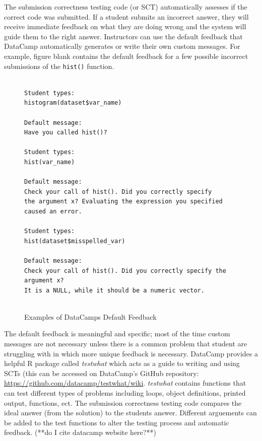 \documentclass[12pt]{article}
\begin{document}
The submission correctness testing code (or SCT) automatically assesses if the correct code was submitted. If a student submits an 
incorrect answer, they will receive immediate feedback on what they are doing wrong and the system will guide them to the right answer.
Instructors can use the default feedback that DataCamp automatically generates or write their own custom messages. For example, figure blank
contains the default feedback for a few possible incorrect submissions of the \texttt{hist()} function.


\begin{figure}
\caption{Examples of DataCamps Default Feedback}
\begin{Verbatim}[frame=single]

Student types:
histogram(dataset$var_name)

Default message:
Have you called hist()?

Student types:
hist(var_name)

Default message:
Check your call of hist(). Did you correctly specify 
the argument x? Evaluating the expression you specified
caused an error.

Student types:
hist(dataset$misspelled_var)

Default message:
Check your call of hist(). Did you correctly specify the
argument x? 
It is a NULL, while it should be a numeric vector.


\end{Verbatim}
\label{fig:code1}
\end{figure}


















The default feedback is meaningful and specific; most of the time custom 
messages are not necessary unless there is a common problem that student are struggling with in which more unique feedback is necessary. 
DataCamp provides a helpful R package called \textit{testwhat} which acts as a guide to writing and using SCTs (this can be accessed on DataCamp's GitHub 
repository: \url{https://github.com/datacamp/testwhat/wiki}. 
\textit{testwhat} contains functions that can test different types of problems including loops, object definitions, printed output, functions, ect.
The submission correctness testing code compares the ideal answer (from the solution) to the students answer. Different
arguements can be added to the test functions to alter the testing process and automatic feedback. (**do I cite datacamp website here?**)
\end{document}
